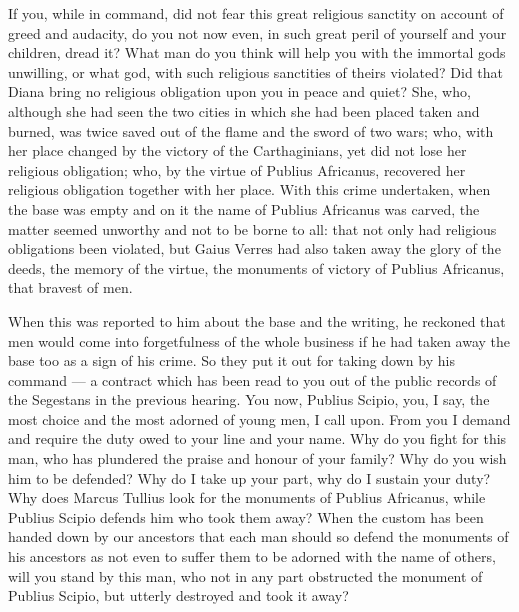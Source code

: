  If you, while in command, did not fear this great religious sanctity on account of greed and audacity, do you not now even, in such great peril of yourself and your children, dread it? What man do you think will help you with the immortal gods unwilling, or what god, with such religious sanctities of theirs violated? Did that Diana bring no religious obligation upon you in peace and quiet? She, who, although she had seen the two cities in which she had been placed taken and burned, was twice saved out of the flame and the sword of two wars; who, with her place changed by the victory of the Carthaginians, yet did not lose her religious obligation; who, by the virtue of Publius Africanus, recovered her religious obligation together with her place. With this crime undertaken, when the base was empty and on it the name of Publius Africanus was carved, the matter seemed unworthy and not to be borne to all: that not only had religious obligations been violated, but Gaius Verres had also taken away the glory of the deeds, the memory of the virtue, the monuments of victory of Publius Africanus, that bravest of men.

 When this was reported to him about the base and the writing, he reckoned that men would come into forgetfulness of the whole business if he had taken away the base too as a sign of his crime. So they put it out for taking down by his command --- a contract which has been read to you out of the public records of the Segestans in the previous hearing. You now, Publius Scipio, you, I say, the most choice and the most adorned of young men, I call upon. From you I demand and require the duty owed to your line and your name. Why do you fight for this man, who has plundered the praise and honour of your family? Why do you wish him to be defended? Why do I take up your part, why do I sustain your duty? Why does Marcus Tullius look for the monuments of Publius Africanus, while Publius Scipio defends him who took them away? When the custom has been handed down by our ancestors that each man should so defend the monuments of his ancestors as not even to suffer them to be adorned with the name of others, will you stand by this man, who not in any part obstructed the monument of Publius Scipio, but utterly destroyed and took it away?

